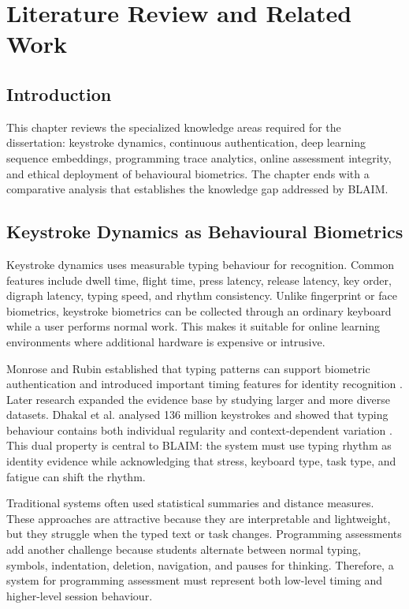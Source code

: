\chapter{Literature Review and Related Work}
\label{chap:literature}

\section{Introduction}
\label{sec:lit-intro}

This chapter reviews the specialized knowledge areas required for the dissertation: keystroke dynamics, continuous authentication, deep learning sequence embeddings, programming trace analytics, online assessment integrity, and ethical deployment of behavioural biometrics. The chapter ends with a comparative analysis that establishes the knowledge gap addressed by BLAIM.

\section{Keystroke Dynamics as Behavioural Biometrics}
\label{sec:lit-keystroke}

Keystroke dynamics uses measurable typing behaviour for recognition. Common features include dwell time, flight time, press latency, release latency, key order, digraph latency, typing speed, and rhythm consistency. Unlike fingerprint or face biometrics, keystroke biometrics can be collected through an ordinary keyboard while a user performs normal work. This makes it suitable for online learning environments where additional hardware is expensive or intrusive.

Monrose and Rubin established that typing patterns can support biometric authentication and introduced important timing features for identity recognition \cite{monrose2000keystroke}. Later research expanded the evidence base by studying larger and more diverse datasets. Dhakal et al. analysed 136 million keystrokes and showed that typing behaviour contains both individual regularity and context-dependent variation \cite{dhakal2018observations}. This dual property is central to BLAIM: the system must use typing rhythm as identity evidence while acknowledging that stress, keyboard type, task type, and fatigue can shift the rhythm.

Traditional systems often used statistical summaries and distance measures. These approaches are attractive because they are interpretable and lightweight, but they struggle when the typed text or task changes. Programming assessments add another challenge because students alternate between normal typing, symbols, indentation, deletion, navigation, and pauses for thinking. Therefore, a system for programming assessment must represent both low-level timing and higher-level session behaviour.

